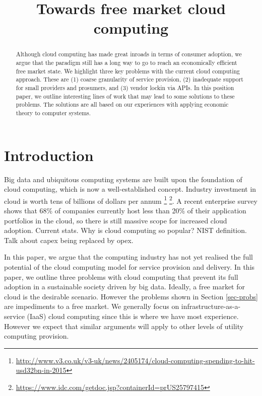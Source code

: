 \documentclass[conference,10pt]{IEEEtran}
\begin{document}
\title{Towards free market cloud computing}


\author{
}

\maketitle


\begin{abstract}
Although cloud computing has made great inroads in terms of consumer adoption, we argue that the paradigm still has a long way to go to reach an economically efficient free market state.
We highlight three key problems with the current cloud computing approach. These are (1) coarse granularity of service provision, (2) inadequate support for small providers and prosumers, and (3) vendor lockin via APIs.
In this position paper, we outline interesting lines of work that may lead to some solutions to these problems. The solutions are all based on our experiences with applying economic theory to computer systems.
\end{abstract}


\section{Introduction}
\label{sec-intro}

Big data and ubiquitous computing systems are built upon the foundation of cloud computing, which is now a well-established concept. Industry investment in cloud is worth tens of billions of dollars per annum \footnote{
\url{http://www.v3.co.uk/v3-uk/news/2405174/cloud-computing-spending-to-hit-usd32bn-in-2015}} \footnote{\url{https://www.idc.com/getdoc.jsp?containerId=prUS25797415}}. 
A recent enterprise survey shows that 68\% of companies currently host less than 20\% of their application portfolios in the cloud, so there is still massive scope for increased cloud adoption.
Current stats. Why is cloud computing so popular? NIST definition. Talk about capex being replaced by opex.

In this paper, we argue that the computing industry has not yet realised the full potential of the cloud computing model for service provision and delivery. In this paper, we outline three problems with cloud computing that prevent its full adoption in a sustainable society driven by big data.
Ideally, a free market for cloud is the desirable scenario. However the problems shown in Section \ref{sec-probs}
are impediments to a free market.
We generally focus on infrastructure-as-a-service (IaaS) cloud computing since this is where we have most experience. However we expect that similar arguments will apply to other levels of utility computing provision.
\end{document}
